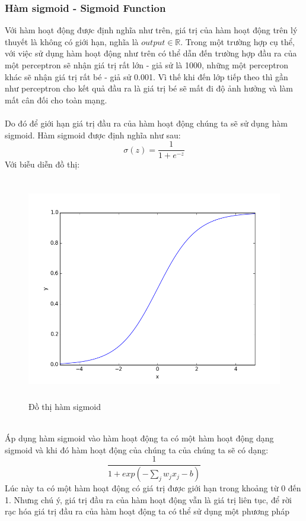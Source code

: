 \subsubsection{Hàm sigmoid - Sigmoid Function}
Với hàm hoạt động được định nghĩa như trên, giá trị của hàm hoạt động trên lý 
thuyết là không có giới hạn, nghĩa là $output\in\mathbb{R}$. Trong một trường 
hợp cụ thể, với việc sử dụng hàm hoạt động như trên có thể dẫn đến trường hợp 
đầu ra của một perceptron sẽ nhận giá trị rất lớn - giả sử là 1000, những một 
perceptron khác sẽ nhận giá trị rất bé - giả sử 0.001. Vì thế khi đến lớp tiếp 
theo thì gần như perceptron cho kết quả đầu ra là giá trị bé sẽ mất đi độ ảnh 
hưởng và làm mất cân đối cho toàn mạng.\\\\
Do đó để giới hạn giá trị đầu ra của hàm hoạt động chúng ta sẽ sử dụng hàm 
sigmoid. Hàm sigmoid được định nghĩa như sau:\\
\[
  \sigma(z)=\frac{1}{1+e^{-z}}
\]
Với biễu diễn đồ thị:
\begin{figure}[h!]
\centering
\includegraphics[height=3.85in, keepaspectratio=true]{sigmoid.png}
\caption{Đồ thị hàm sigmoid}
\end{figure}\\
Áp dụng hàm sigmoid vào hàm hoạt động ta có một hàm hoạt động dạng sigmoid và 
khi đó hàm hoạt động của chúng ta của chúng ta sẽ có dạng:\\
\[
  \frac{1}{1+exp(-\sum_j w_j x_j -b)}
\]
Lúc này ta có một hàm hoạt động có giá trị được giới hạn trong khoảng từ 0 đến 
1. Nhưng chú ý, giá trị đầu ra của hàm hoạt động vẫn là giá trị liên tục, để 
rời rạc hóa giá trị đầu ra của hàm hoạt động ta có thể sử dụng một phương pháp 
